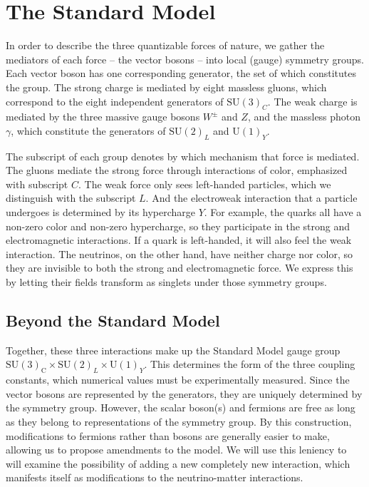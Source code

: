 \section{The Standard Model}\label{ch:SM}
In order to describe the three quantizable forces of nature, we gather the mediators of each force -- the vector bosons -- into local (gauge) symmetry groups. 
Each vector boson has one corresponding generator, the set of which constitutes the group.
The strong charge is mediated by eight massless gluons, which correspond to the eight independent generators of $\text{SU}(3)_C$. 
The weak charge is mediated by the three massive gauge bosons $W^\pm$ and $Z$, and the massless photon $\gamma$, 
which constitute the generators of $\text{SU}(2)_L$ and $\text{U}(1)_Y$. 

The subscript of each group denotes by which mechanism that force is mediated. The gluons mediate the strong force through interactions of color,
emphasized with subscript $C$. The weak force only sees left-handed particles, 
which we distinguish with the subscript $L$. And the electroweak interaction that a particle undergoes is determined by its hypercharge $Y$. 
For example, the quarks all have a non-zero color and non-zero hypercharge, 
so they participate in the strong and electromagnetic interactions. If a quark is left-handed, it will also feel the weak interaction. 
The neutrinos, on the other hand, have neither charge nor color, 
so they are invisible to both the strong and electromagnetic force. We express this by letting their fields transform as singlets under those symmetry groups.

\subsection{Beyond the Standard Model}
Together, these three interactions make up the Standard Model gauge group $\mathrm{SU}(3)_{\mathrm{C}} \times \mathrm{SU}(2)_{L} \times \mathrm{U}(1)_{Y}$. 
This determines the form of the three coupling constants, which numerical values must be experimentally measured. 
Since the vector bosons are represented by the generators, they are uniquely determined by the symmetry group. However, the scalar boson(s) and fermions are free as long as they
belong to representations of the symmetry group. By this construction, modifications to fermions rather than bosons are generally easier to make, allowing us to propose amendments to the model. 
We will use this leniency to will examine the possibility of adding a new completely new interaction, which manifests itself as modifications to the neutrino-matter interactions.
